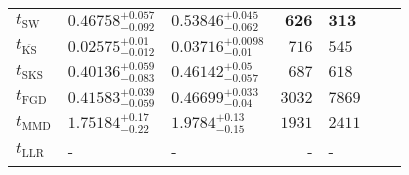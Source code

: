 \begin{tabular}{l|llr|llr}
	\midrule
	$t_{\mathrm{SW}}$ & $0.46758_{-0.092}^{+0.057}$ & $0.53846_{-0.062}^{+0.045}$ & ${\mathbf{626}}$ & ${\mathbf{313}}$ \\
	$t_{\overline{\mathrm{KS}}}$ & ${\mathbf{0.02575_{-0.012}^{+0.01}}}$ & ${\mathbf{0.03716_{-0.01}^{+0.0098}}}$ & $716$ & $545$ \\
	$t_{\mathrm{SKS}}$ & $0.40136_{-0.083}^{+0.059}$ & $0.46142_{-0.057}^{+0.05}$ & $687$ & $618$ \\
	$t_{\mathrm{FGD}}$ & $0.41583_{-0.059}^{+0.039}$ & $0.46699_{-0.04}^{+0.033}$ & $3032$ & $7869$ \\
	$t_{\mathrm{MMD}}$ & $1.75184_{-0.22}^{+0.17}$ & $1.9784_{-0.15}^{+0.13}$ & $1931$ & $2411$ \\
	$t_{\mathrm{LLR}}$ & - & - & - & - \\
	\bottomrule
\end{tabular}